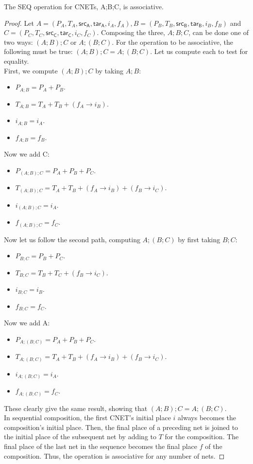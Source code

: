 \begin{lemma}
\label{lemma:SEQ-ASSOC}
The SEQ operation for CNETs, A;B;C, is associative.
\end{lemma}
\begin{proof}
Let $A = (P_A, T_A, \mathsf{src_A}, \mathsf{tar_A}, i_A, f_A) , B = (P_B, T_B, \mathsf{src_B}, \mathsf{tar_B}, i_B, f_B)$ and $C = (P_C, T_C, \mathsf{src_C}, \mathsf{tar_C}, i_C, f_C)$. Composing the three, $A;B;C$, can be done one of two ways: $(A;B);C$ or $ A;(B;C)$. For the operation to be associative, the following must be true: $(A;B);C = A;(B;C).$ Let us compute each to test for equality.\\
First, we compute $(A;B);C$ by taking $A;B$:
\begin{itemize}
\item $P_{A;B} = P_A + P_B.$
\item $T_{A;B} = T_A + T_B + (f_A \to i_B)$.
\item $i_{A;B} = i_A.$
\item $f_{A;B} = f_B. $
\end{itemize} 
Now we add C:
\begin{itemize}
\item $P_{(A;B);C} = P_A + P_B + P_C.$
\item $T_{(A;B);C} = T_A + T_B + (f_A \to i_B) + (f_B \to i_C).$
\item $i_{(A;B);C} = i_A.$
\item $f_{(A;B);C} = f_C. $
\end{itemize}
Now let us follow the second path, computing $A;(B;C)$ by first taking $B;C$:
\begin{itemize}
\item $P_{B;C} = P_B + P_C.$
\item $T_{B;C} = T_B + T_C + (f_B \to i_C).$
\item $i_{B;C} = i_B.$
\item $f_{B;C} = f_C.$ 
\end{itemize} 
Now we add A:
\begin{itemize}
\item $P_{A;(B;C)} = P_A + P_B + P_C.$
\item $T_{A;(B;C)} = T_A + T_B + (f_A \to i_B) + (f_B \to i_C).$
\item $i_{A;(B;C)} = i_A.$
\item$ f_{A;(B;C)} = f_C. $
\end{itemize}  
These clearly give the same result, showing that $(A;B);C = A;(B;C).$ \\
In sequential composition, the first CNET's initial place $i$ always becomes the composition's initial place. Then, the final place of a preceding net is joined to the initial place of the subsequent net by adding to $T$ for the composition. The final place of the last net in the sequence becomes the final place $f$ of the composition. Thus, the operation is associative for any number of nets.
\end{proof}
